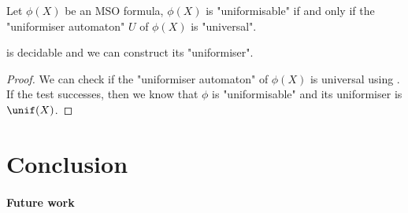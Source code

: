 \documentclass[a4paper,UKenglish,cleveref, autoref, thm-restate]{lipics-v2021}
\begin{document}
\begin{theorem}
	Let $\phi(X)$ be an MSO formula, $\phi(X)$ is "uniformisable" if and only if the "uniformiser automaton" $U$ of $\phi(X)$ is "universal".
\end{theorem}

\begin{coro}
	 is decidable and we can construct its "uniformiser". 
\end{coro}

\begin{proof}
	We can check if the "uniformiser automaton" of $\phi(X)$ is universal using . If the test successes,
	then we know that $\phi$ is "uniformisable" and its uniformiser is $\unif(X)$.
\end{proof}

\section{Conclusion}


\paragraph{Future work}



\end{document}

